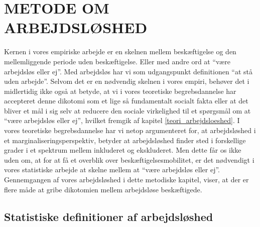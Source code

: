 

\chapter{METODE OM ARBEJDSLØSHED} \label{metode_arbejdsloeshed}





Kernen i vores empiriske arbejde er en skelnen mellem beskæftigelse og den mellemliggende periode uden beskæftigelse. Eller med andre ord at “være arbejdsløs eller ej”. Med arbejdsløs har vi som udgangspunkt definitionen “at stå uden arbejde”. Selvom det er en nødvendig skelnen i vores empiri, behøver det i midlertidig ikke også at betyde, at vi i vores teoretiske begrebsdannelse har accepteret denne dikotomi som et lige så fundamentalt socialt fakta eller at det bliver et mål i sig selv at reducere den sociale virkelighed til et spørgsmål om at “være arbejdsløs eller ej”, hvilket fremgik af kapitel \ref{teori_arbejdsloeshed}. I vores teoretiske begrebsdannelse har vi netop argumenteret for, at arbejdsløshed i et marginaliseringsperspektiv, betyder at arbejdsløshed finder sted i forskellige grader i et spektrum mellem inkluderet og ekskluderet. Men dette får os ikke uden om, at for at få et overblik over beskæftigelsesmobilitet, er det nødvendigt i vores statistiske arbejde at skelne mellem at “være arbejdsløs eller ej”. Gennemgangen af vores arbejdsløshed i dette metodiske kapitel, viser, at der er flere måde at gribe dikotomien mellem arbejdsløse beskæftigede. 





\section{Statistiske definitioner af arbejdsløshed \label{arbejdsloes_statistiske_definitioner}} 

